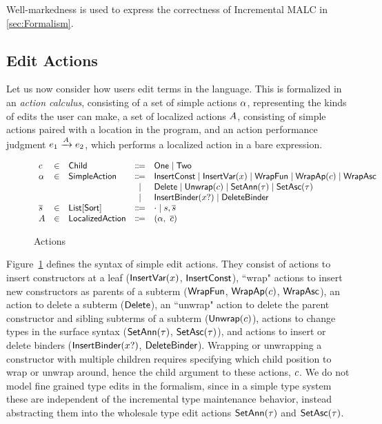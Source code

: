 Well-markedness is used to express the correctness of Incremental MALC in \autoref{sec:Formalism}.

\subsection{Edit Actions}

Let us now consider how users edit terms in the language. This is formalized in an \textit{action calculus}, consisting of a set of simple actions $\alpha$, representing the kinds of edits the user can make, a set of localized actions $A$, consisting of simple actions paired with a location in the program, and an action performance judgment $e_1\xrightarrow{A}e_2$, which performs a localized action in a bare expression. 

\begin{figure}
    \[\begin{array}{lclcll}
    c & \in & {\normalfont\textsf{Child}} & \Coloneqq & {\normalfont\textsf{One}} \mid{\normalfont\textsf{Two}} \\
    \alpha & \in & {\normalfont\textsf{SimpleAction}} & \Coloneqq & {\normalfont\textsf{InsertConst}} \mid {\normalfont\textsf{InsertVar}}(x) \mid {\normalfont\textsf{WrapFun}} \mid {\normalfont\textsf{WrapAp}}(c)\mid{\normalfont\textsf{WrapAsc}}\\
        &&&\mid &{\normalfont\textsf{Delete}} \mid {\normalfont\textsf{Unwrap}}(c)\mid {\normalfont\textsf{SetAnn}}(\tau) \mid {\normalfont\textsf{SetAsc}}(\tau)\\
        &&&\mid &{\normalfont\textsf{InsertBinder}}(x?)\mid {\normalfont\textsf{DeleteBinder}}\\
    \overline{s} & \in & \mathsf{List[Sort]} & \Coloneqq & \cdot \mid s,\overline{s}\\ 
    A & \in & {\normalfont\textsf{LocalizedAction}} & \Coloneqq & (\alpha,~\overline{c}) 
    \end{array}\]
    \vspace{-10pt}
    \caption{Actions}
    \label{fig:actions}
\end{figure}

Figure~\ref{fig:actions} defines the syntax of simple edit actions. They consist of actions to insert constructors at a leaf (${\normalfont\textsf{InsertVar}}(x)$, ${\normalfont\textsf{InsertConst}}$), ``wrap" actions to insert new constructors as parents of a subterm (${\normalfont\textsf{WrapFun}}$, ${\normalfont\textsf{WrapAp}}(c)$, ${\normalfont\textsf{WrapAsc}}$), an action to delete a subterm (${\normalfont\textsf{Delete}}$), an ``unwrap" action to delete the parent constructor and sibling subterms of a subterm (${\normalfont\textsf{Unwrap}}(c)$), actions to change types in the surface syntax (${\normalfont\textsf{SetAnn}}(\tau)$, ${\normalfont\textsf{SetAsc}}(\tau)$), and actions to insert or delete binders (${\normalfont\textsf{InsertBinder}}(x?)$, ${\normalfont\textsf{DeleteBinder}}$). Wrapping or unwrapping a constructor with multiple children requires specifying which child position to wrap or unwrap around, hence the child argument to these actions, $c$. We do not model fine grained type edits in the formalism, since in a simple type system these are independent of the incremental type maintenance behavior, instead abstracting them into the wholesale type edit actions ${\normalfont\textsf{SetAnn}}(\tau)$ and ${\normalfont\textsf{SetAsc}}(\tau)$. 

